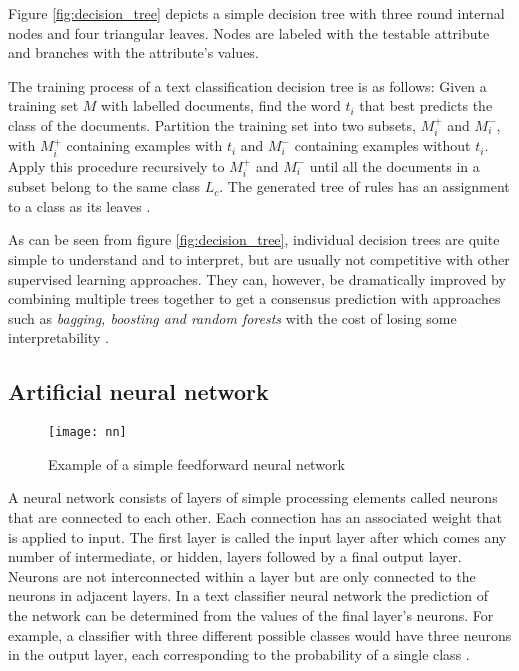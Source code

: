 Figure \ref{fig:decision_tree} depicts a simple decision tree with three round internal nodes and four triangular leaves.
Nodes are labeled with the testable attribute and branches with the attribute's values.

The training process of a text classification decision tree is as follows: Given a training set $M$ with labelled documents, find the word $t_i$ that best predicts the class of the documents.
Partition the training set into two subsets, $M^+_i$ and $M^-_i$, with $M^+_i$ containing examples with $t_i$ and $M^-_i$ containing examples without $t_i$.
Apply this procedure recursively to $M^+_i$ and $M^-_i$ until all the documents in a subset belong to the same class $L_c$.
The generated tree of rules has an assignment to a class as its leaves \cite{hotho}.

As can be seen from figure \ref{fig:decision_tree}, individual decision trees are quite simple to understand and to interpret, but are usually not competitive with other supervised learning approaches.
They can, however, be dramatically improved by combining multiple trees together to get a consensus prediction with approaches such as \textit{bagging, boosting and random forests} with the cost of losing some interpretability \cite{james2013}.

\subsection{Artificial neural network} \label{Artificial neural network}
\begin{figure}[t]
\texttt{[image: nn]}
\centering
\caption{Example of a simple feedforward neural network}
\label{fig:nn}
\end{figure}

A neural network consists of layers of simple processing elements called neurons that are connected to each other.
Each connection has an associated weight that is applied to input.
The first layer is called the input layer after which comes any number of intermediate, or hidden, layers followed by a final output layer.
Neurons are not interconnected within a layer but are only connected to the neurons in adjacent layers.
In a text classifier neural network the prediction of the network can be determined from the values of the final layer's neurons.
For example, a classifier with three different possible classes would have three neurons in the output layer, each corresponding to the probability of a single class \cite{pal1992}.


